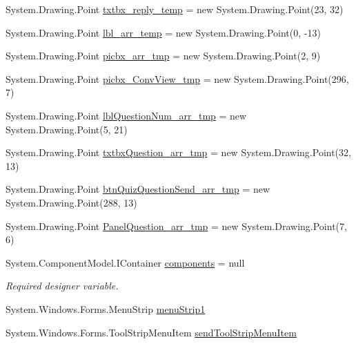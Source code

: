 \begin{DoxyCompactItemize}
\item 
\-System.\-Drawing.\-Point \hyperlink{class_sr_p___classroom_inq_1_1frm_classrrom_inq_a0b175596cb83997b38795ee916c978f1}{txtbx\-\_\-reply\-\_\-temp} = new \-System.\-Drawing.\-Point(23, 32)
\item 
\-System.\-Drawing.\-Point \hyperlink{class_sr_p___classroom_inq_1_1frm_classrrom_inq_ae3405b23105270490b9685ac52e1b574}{lbl\-\_\-arr\-\_\-temp} = new \-System.\-Drawing.\-Point(0, -\/13)
\item 
\-System.\-Drawing.\-Point \hyperlink{class_sr_p___classroom_inq_1_1frm_classrrom_inq_a019be294be5d02bea4369298d2a135db}{picbx\-\_\-arr\-\_\-tmp} = new \-System.\-Drawing.\-Point(2, 9)
\item 
\-System.\-Drawing.\-Point \hyperlink{class_sr_p___classroom_inq_1_1frm_classrrom_inq_ae49fd425a3c4f52d94af6c20b67f6126}{picbx\-\_\-\-Conv\-View\-\_\-tmp} = new \-System.\-Drawing.\-Point(296, 7)
\item 
\-System.\-Drawing.\-Point \hyperlink{class_sr_p___classroom_inq_1_1frm_classrrom_inq_a9af0d3cc5171be1c8b01ea1e208d61ee}{lbl\-Question\-Num\-\_\-arr\-\_\-tmp} = new \-System.\-Drawing.\-Point(5, 21)
\item 
\-System.\-Drawing.\-Point \hyperlink{class_sr_p___classroom_inq_1_1frm_classrrom_inq_a09f25b6934ed463e8b781498b5511796}{txtbx\-Question\-\_\-arr\-\_\-tmp} = new \-System.\-Drawing.\-Point(32, 13)
\item 
\-System.\-Drawing.\-Point \hyperlink{class_sr_p___classroom_inq_1_1frm_classrrom_inq_a8dcbe5ae5d44d445994571c17345e756}{btn\-Quiz\-Question\-Send\-\_\-arr\-\_\-tmp} = new \-System.\-Drawing.\-Point(288, 13)
\item 
\-System.\-Drawing.\-Point \hyperlink{class_sr_p___classroom_inq_1_1frm_classrrom_inq_a3e546b9b0c603a788d0316efe572c960}{\-Panel\-Question\-\_\-arr\-\_\-tmp} = new \-System.\-Drawing.\-Point(7, 6)
\item 
\-System.\-Component\-Model.\-I\-Container \hyperlink{class_sr_p___classroom_inq_1_1frm_classrrom_inq_a9ae295b3d0621cd5e50bcf8a475c0686}{components} = null
\begin{DoxyCompactList}\small\item\em \-Required designer variable. \end{DoxyCompactList}\item 
\-System.\-Windows.\-Forms.\-Menu\-Strip \hyperlink{class_sr_p___classroom_inq_1_1frm_classrrom_inq_a549704b03b13cfbb5cbc07c18c0c600a}{menu\-Strip1}
\item 
\-System.\-Windows.\-Forms.\-Tool\-Strip\-Menu\-Item \hyperlink{class_sr_p___classroom_inq_1_1frm_classrrom_inq_ab491a97cbd395fd4e69e4312fdc48eeb}{send\-Tool\-Strip\-Menu\-Item}

\end{DoxyCompactItemize}
